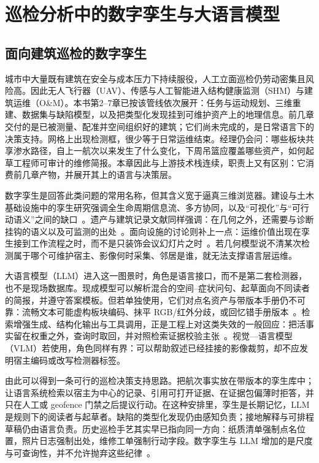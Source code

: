 \chapter{巡检分析中的数字孪生与大语言模型}
\label{ch:llm-dt}


\section{面向建筑巡检的数字孪生}
\label{sec:ch8-dt}

城市中大量既有建筑在安全与成本压力下持续服役，人工立面巡检仍劳动密集且风险高。因此无人飞行器（UAV）、传感与人工智能进入结构健康监测（SHM）与建筑运维（O\&M）。本书第2--7章已按该管线依次展开：任务与运动规划、三维重建、数据集与缺陷模型，以及把类型化发现挂到可维护资产上的地理信息。前几章交付的是已被测量、配准并空间组织好的建筑；它们尚未完成的，是日常语言下的决策支持。网格上出现检测框，很少等于日常运维结束。经理仍会问：哪些板块共享渗水路径，自上一航次以来发生了什么变化，下周吊篮应覆盖哪些资产，如何起草工程师可审计的维修简报。本章因此与上游技术栈连续，职责上又有区别：它消费前几章产物，并展开其上的语言与决策层。

数字孪生是回答此类问题的常用名称，但其含义宽于逼真三维浏览器。建设与土木基础设施中的孪生研究强调全生命周期信息流、多方协同，以及``可视化''与``可行动语义''之间的缺口~\cite{boje2020,opoku2021,lu2020}。遗产与建筑记录文献同样强调：在几何之外，还需要与诊断挂钩的语义以及可监测的出处~\cite{bruno2018,tsilimantou2020}。面向设施的讨论则补上一点：运维价值出现在孪生接到工作流程之时，而不是只装饰会议幻灯片之时~\cite{chen2023facility,lu2020}。若几何模型说不清某次检测属于哪个可维护宿主、影像何时采集、邻居是谁，就无法支撑语言层运维。

大语言模型（LLM）进入这一图景时，角色是语言接口，而不是第二套检测器，也不是现场数据库。现成模型可以解析混合的空间--症状问句、起草面向不同读者的简报，并遵守答案模板。但若单独使用，它们对点名资产与带版本手册仍不可靠：流畅文本可能虚构板块编码、抹平 RGB/红外分歧，或回忆错手册版本~\cite{ji2023,lewis2020}。检索增强生成、结构化输出与工具调用，正是工程上对这类失效的一般回应：把活事实留在权重之外，查询时取回，并对照检索证据校验主张~\cite{lewis2020,shuster2021,yao2023react}。视觉—语言模型（VLM）若使用，角色同样有界：可以帮助叙述已经挂接的影像裁剪，却不应发明宿主编码或改写检测器标签。

由此可以得到一条可行的巡检决策支持思路。把航次事实放在带版本的孪生库中；让语言系统检索以宿主为中心的记录、引用可打开证据、在证据包偏薄时拒答，并只在人工或 geofence 门禁之后提议行动。在这种安排里，孪生是长期记忆，LLM 是规则下的阅读者与起草者。缺陷的类型化发现仍由感知负责；接地解释与可排程草稿仍由语言负责。历史巡检手艺其实早已指向同一方向：纸质清单强制点名位置，照片日志强制出处，维修工单强制行动字段。数字孪生与 LLM 增加的是尺度与可查询性，并不允许抛弃这些纪律~\cite{zhang2022,chen2023facility,ji2023}。

